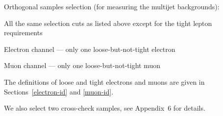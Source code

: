 \vspace{-0.07in}
Orthogonal samples selection (for measuring the multijet backgrounds):
\vspace{-0.07in}
\begin{myitemize}
\item All the same selection cuts as listed above except for the
tight lepton requirements
\item Electron channel --- only one loose-but-not-tight electron
\item Muon channel --- only one loose-but-not-tight muon
\end{myitemize}
\vspace{-0.07in}
The definitions of loose and tight electrons and muons are given in
Sections~\ref{electron-id} and \ref{muon-id}.

\noindent We also select two cross-check samples, see Appendix~6 for
details.



